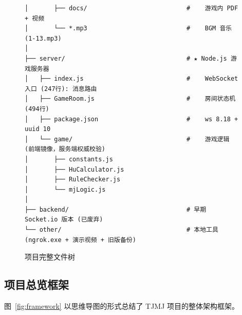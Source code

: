 \documentclass[11pt,a4paper]{article}
\begin{document}
\begin{figure}[H]
\begin{verbatim}
│       ├── docs/                           #    游戏内 PDF + 视频
│       └── *.mp3                           #    BGM 音乐 (1-13.mp3)
│
├── server/                                 # ★ Node.js 游戏服务器
│   ├── index.js                            #    WebSocket 入口 (247行): 消息路由
│   ├── GameRoom.js                         #    房间状态机 (494行)
│   ├── package.json                        #    ws 8.18 + uuid 10
│   └── game/                               #    游戏逻辑 (前端镜像，服务端权威校验)
│       ├── constants.js
│       ├── HuCalculator.js
│       ├── RuleChecker.js
│       └── mjLogic.js
│
├── backend/                                # 早期 Socket.io 版本 (已废弃)
└── other/                                  # 本地工具 (ngrok.exe + 演示视频 + 旧版备份)
\end{verbatim}
\caption{项目完整文件树}
\label{fig:tree}
\end{figure}

\subsection{项目总览框架}

图~\ref{fig:framework} 以思维导图的形式总结了 TJMJ 项目的整体架构框架。
\end{document}
